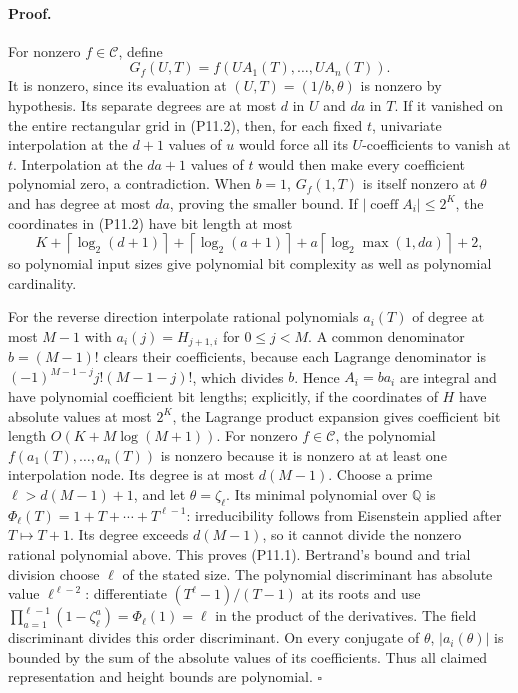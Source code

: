 \paragraph{Proof.}
For nonzero $f\in\mathcal C$, define
\[
 G_f(U,T)=f(UA_1(T),\ldots,UA_n(T)).
\]
It is nonzero, since its evaluation at $(U,T)=(1/b,\theta)$ is nonzero by hypothesis. Its separate degrees are at most $d$ in $U$ and $da$ in $T$. If it vanished on the entire rectangular grid in (P11.2), then, for each fixed $t$, univariate interpolation at the $d+1$ values of $u$ would force all its $U$-coefficients to vanish at $t$. Interpolation at the $da+1$ values of $t$ would then make every coefficient polynomial zero, a contradiction. When $b=1$, $G_f(1,T)$ is itself nonzero at $\theta$ and has degree at most $da$, proving the smaller bound. If $|\operatorname{coeff} A_i|\le2^K$, the coordinates in (P11.2) have bit length at most
\[
 K+\left\lceil\log_2(d+1)\right\rceil
  +\left\lceil\log_2(a+1)\right\rceil
  +a\left\lceil\log_2\max(1,da)\right\rceil+2,
\]
so polynomial input sizes give polynomial bit complexity as well as polynomial cardinality.

For the reverse direction interpolate rational polynomials $a_i(T)$ of degree at most $M-1$ with $a_i(j)=H_{j+1,i}$ for $0\le j<M$. A common denominator $b=(M-1)!$ clears their coefficients, because each Lagrange denominator is $(-1)^{M-1-j}j!(M-1-j)!$, which divides $b$. Hence $A_i=ba_i$ are integral and have polynomial coefficient bit lengths; explicitly, if the coordinates of $H$ have absolute values at most $2^K$, the Lagrange product expansion gives coefficient bit length $O(K+M\log(M+1))$. For nonzero $f\in\mathcal C$, the polynomial $f(a_1(T),\ldots,a_n(T))$ is nonzero because it is nonzero at at least one interpolation node. Its degree is at most $d(M-1)$. Choose a prime $\ell>d(M-1)+1$, and let $\theta=\zeta_\ell$. Its minimal polynomial over $\mathbb Q$ is $\Phi_\ell(T)=1+T+\cdots+T^{\ell-1}$: irreducibility follows from Eisenstein applied after $T\mapsto T+1$. Its degree exceeds $d(M-1)$, so it cannot divide the nonzero rational polynomial above. This proves (P11.1). Bertrand's bound and trial division choose $\ell$ of the stated size. The polynomial discriminant has absolute value $\ell^{\ell-2}$: differentiate $(T^\ell-1)/(T-1)$ at its roots and use $\prod_{a=1}^{\ell-1}(1-\zeta_\ell^a)=\Phi_\ell(1)=\ell$ in the product of the derivatives. The field discriminant divides this order discriminant. On every conjugate of $\theta$, $|a_i(\theta)|$ is bounded by the sum of the absolute values of its coefficients. Thus all claimed representation and height bounds are polynomial. $\square$

